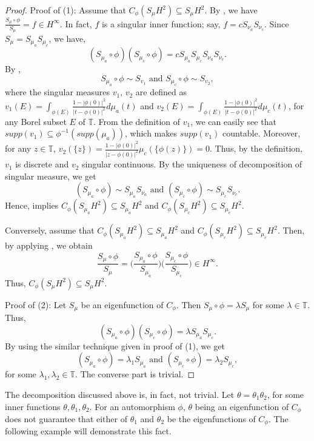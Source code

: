 \documentclass[12pt, reqno]{amsart}
\theoremstyle{definition}
\numberwithin{equation}{section}
\begin{document}
\begin{proof}
Proof of (1): Assume that $C_\phi(S_\mu H^2)\subseteq S_\mu H^2$. By \cite[Theorem 2.3]{buerlingtype}, we have $
\frac{S_\mu \circ \phi}{S_\mu}=f \in H^\infty$. In fact, $f$ is a singular inner function; say, $f=cS_{\nu_a}S_{\nu_c}$. Since  $S_\mu= S_{\mu_a}S_{\mu_c}$,
we have, $$  (S_{\mu_a}\circ \phi)(S_{\mu_c}\circ \phi)=cS_{\mu_a}S_{\mu_c}S_{\nu_a}S_{\nu_c}.$$ By \cite[Lemma 4]{jones}, 
$$S_{\mu_a}\circ \phi\sim S_{v_1} \text{ and }S_{\mu_c}\circ \phi\sim S_{v_2},$$
where the singular measures $v_1, \,v_2$ are defined as $v_1(E)=\int_{\phi(E)}\frac{1-|\phi(0)|^2}{|t-\phi(0)|^2}d\mu_a(t)$ and $v_2(E)=\int_{\phi(E)}\frac{1-|\phi(0)|^2}{|t-\phi(0)|^2}d\mu_c(t)$, for any Borel subset $E$ of $\mathbb{T}$. From the definition of $v_1$, we can easily see that $supp(v_1)\subseteq \phi^{-1}(supp(\mu_a))$, which makes $supp(v_1)$ countable. Moreover, for any $z \in \mathbb{T}$,
$v_2(\{z\})=\frac{1-|\phi(0)|^2}{|z-\phi(0)|^2}\mu_c(\{\phi(z)\})=0.$
Thus, by the definition, $v_1$ is discrete and ${v_2}$ singular continuous. By the uniqueness of decomposition of singular measure, we get
$$(S_{\mu_a}\circ \phi)\sim S_{\mu_a}S_{\nu_a}
\text{ and }
(S_{\mu_c}\circ \phi)\sim S_{\mu_c}S_{\nu_c}.$$
Hence, \cite[Theorem 2.3]{buerlingtype} implies $C_\phi(S_{\mu_a} H^2)\subseteq S_{\mu_a }H^2$ and $C_\phi(S_{\mu_c} H^2)\subseteq S_{\mu_c }H^2$.

Conversely, assume that $C_\phi(S_{\mu_a} H^2)\subseteq S_{\mu_a }H^2$ and $C_\phi(S_{\mu_c} H^2)\subseteq S_{\mu_c }H^2$. Then, by applying \cite[Theorem 2.3]{buerlingtype}, we obtain $$\dfrac{S_\mu  \circ \phi}{S_\mu}=\Big(\dfrac{S_{\mu_a}\circ \phi}{S_{\mu_a}}\Big)\Big(\dfrac{S_{\mu_c}\circ \phi}{S_{\mu_c}}\Big)\in H^\infty.$$
Thus, $C_\phi(S_\mu H^2)\subseteq S_\mu H^2$.

Proof of (2): Let $S_\mu$ be an eigenfunction of $C_\phi$. Then $S_\mu \circ \phi=\lambda S_\mu$ for some $\lambda \in \mathbb{T}$. Thus, $$  (S_{\mu_a}\circ \phi)(S_{\mu_c}\circ \phi)=\lambda S_{\mu_a}S_{\mu_c}.$$
By using the similar technique given in proof of (1), we get
$$(S_{\mu_a}\circ \phi)=\lambda_1 S_{\mu_a}
\text{ and }
(S_{\mu_c}\circ \phi)=\lambda_2 S_{\mu_c}, $$ for some $\lambda_1, \lambda_2 \in \mathbb{T}$. The converse part is trivial.




\end{proof}
The decomposition discussed above is, in fact, not trivial. Let $\theta=\theta_1 \theta_2$, for some inner functions $\theta, \theta_1,\theta_2$. For an automorphism $\phi$, $\theta$ being an eigenfunction of $C_\phi$ does not guarantee that either of $\theta_1$ and $\theta_2$ be the eigenfunctions of $C_\phi$.
The following example will demonstrate this fact.
\end{document}
